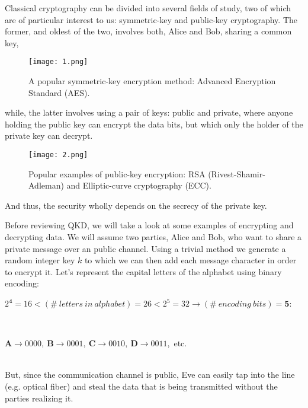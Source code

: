 Classical cryptography can be divided into several fields of study, two of which are of particular interest to us: 
symmetric-key and public-key cryptography. 
The former, and oldest of the two, involves both, Alice and Bob, sharing a common key,
\begin{figure}[!h]
\centerline{\texttt{[image: 1.png]}}
\caption{A popular symmetric-key encryption method: Advanced Encryption Standard (AES).}
\label{fig1}
\end{figure}
while, the latter involves using a pair of keys: public and private, where anyone holding the public key
can encrypt the data bits, but which only the holder of the private key can decrypt.
\begin{figure}[!h]
\centerline{\texttt{[image: 2.png]}}
\caption{Popular examples of public-key encryption: RSA (Rivest-Shamir-Adleman) 
and Elliptic-curve cryptography (ECC).}
\label{fig2}
\end{figure}
And thus, the security wholly depends on the secrecy of the private key.

Before reviewing QKD, we will take a look at some examples of encrypting and decrypting data.
We will assume two parties, Alice and Bob, who want to share a private message over an public channel. 
Using a trivial method we generate a random integer key $k$ to which we can then 
add each message character in order to encrypt it.
Let's represent the capital letters of the alphabet using binary encoding:\\
\centerline{$2^{\bm{4}}=16<(\#\ letters\ in\ alphabet)=26<2^{5}=32 \rightarrow (\#\ encoding\ bits) = \bm{5}$:}\\
\centerline{$\textbf{A} \rightarrow 0000,\ \textbf{B} \rightarrow 0001,\ \textbf{C} \rightarrow 0010,\ \textbf{D} \rightarrow 0011$,\ etc.}\\
But, since the communication channel is public, Eve can easily tap into the line (e.g. optical fiber) 
and steal the data that is being transmitted without the parties realizing it.


